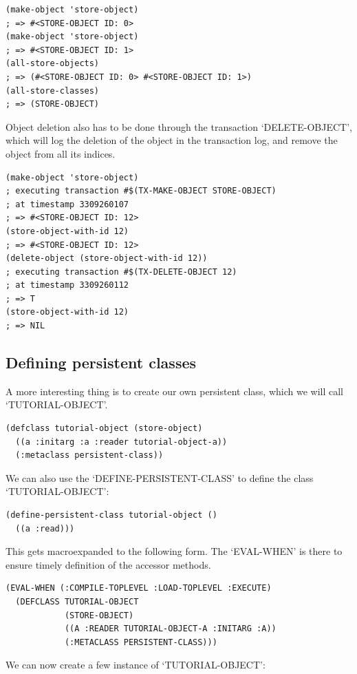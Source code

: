 \begin{Verbatim}[fontsize=\small,frame=leftline,framerule=0.9mm,rulecolor=\color{gray},framesep=5.1mm,xleftmargin=5mm,fontfamily=cmtt]
(make-object 'store-object)
; => #<STORE-OBJECT ID: 0>
(make-object 'store-object)
; => #<STORE-OBJECT ID: 1>
(all-store-objects)
; => (#<STORE-OBJECT ID: 0> #<STORE-OBJECT ID: 1>)
(all-store-classes)
; => (STORE-OBJECT)
\end{Verbatim}
Object deletion also has to be done through the transaction
`DELETE-OBJECT', which will log the deletion of the object in the
transaction log, and remove the object from all its indices.

\begin{Verbatim}[fontsize=\small,frame=leftline,framerule=0.9mm,rulecolor=\color{gray},framesep=5.1mm,xleftmargin=5mm,fontfamily=cmtt]
(make-object 'store-object)
; executing transaction #$(TX-MAKE-OBJECT STORE-OBJECT)
; at timestamp 3309260107
; => #<STORE-OBJECT ID: 12>
(store-object-with-id 12)
; => #<STORE-OBJECT ID: 12>
(delete-object (store-object-with-id 12))
; executing transaction #$(TX-DELETE-OBJECT 12)
; at timestamp 3309260112
; => T
(store-object-with-id 12)
; => NIL
\end{Verbatim}


\subsection{ Defining persistent classes}
A more interesting thing is to create our own persistent class,
which we will call `TUTORIAL-OBJECT'.

\begin{Verbatim}[fontsize=\small,frame=leftline,framerule=0.9mm,rulecolor=\color{gray},framesep=5.1mm,xleftmargin=5mm,fontfamily=cmtt]
(defclass tutorial-object (store-object)
  ((a :initarg :a :reader tutorial-object-a))
  (:metaclass persistent-class))
\end{Verbatim}
We can also use the `DEFINE-PERSISTENT-CLASS' to define the class
`TUTORIAL-OBJECT':

\begin{Verbatim}[fontsize=\small,frame=leftline,framerule=0.9mm,rulecolor=\color{gray},framesep=5.1mm,xleftmargin=5mm,fontfamily=cmtt]
(define-persistent-class tutorial-object ()
  ((a :read)))
\end{Verbatim}
This gets macroexpanded to the following form. The `EVAL-WHEN' is
there to ensure timely definition of the accessor methods.

\begin{Verbatim}[fontsize=\small,frame=leftline,framerule=0.9mm,rulecolor=\color{gray},framesep=5.1mm,xleftmargin=5mm,fontfamily=cmtt]
(EVAL-WHEN (:COMPILE-TOPLEVEL :LOAD-TOPLEVEL :EXECUTE)
  (DEFCLASS TUTORIAL-OBJECT
            (STORE-OBJECT)
            ((A :READER TUTORIAL-OBJECT-A :INITARG :A))
            (:METACLASS PERSISTENT-CLASS)))
\end{Verbatim}
We can now create a few instance of `TUTORIAL-OBJECT':

